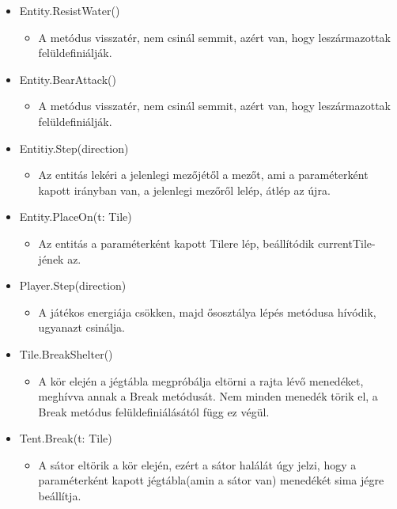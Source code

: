 \begin{itemize}
\item Entity.ResistWater()
\begin{itemize} \item A metódus visszatér, nem csinál semmit, azért van, hogy leszármazottak felüldefiniálják. \end{itemize}

\item Entity.BearAttack()
\begin{itemize} \item A metódus visszatér, nem csinál semmit, azért van, hogy leszármazottak felüldefiniálják. \end{itemize}

\item Entitiy.Step(direction)
\begin{itemize} \item Az entitás lekéri a jelenlegi mezőjétől a mezőt, ami a paraméterként kapott irányban van, a jelenlegi mezőről lelép, átlép az újra. \end{itemize}

\item Entity.PlaceOn(t: Tile)
\begin{itemize} \item Az entitás a paraméterként kapott Tilere lép, beállítódik currentTile-jének az. \end{itemize}

\item Player.Step(direction)
\begin{itemize} \item A játékos energiája csökken, majd ősosztálya lépés metódusa hívódik, ugyanazt csinálja. \end{itemize}

\item Tile.BreakShelter()
\begin{itemize} \item A kör elején a jégtábla megpróbálja eltörni a rajta lévő menedéket, meghívva annak a Break metódusát. Nem minden menedék törik el, a Break metódus felüldefiniálásától függ ez végül. \end{itemize}

\item Tent.Break(t: Tile)
\begin{itemize} \item A sátor eltörik a kör elején, ezért a sátor halálát úgy jelzi, hogy a paraméterként kapott jégtábla(amin a sátor van) menedékét sima jégre beállítja. \end{itemize}


\end{itemize}
